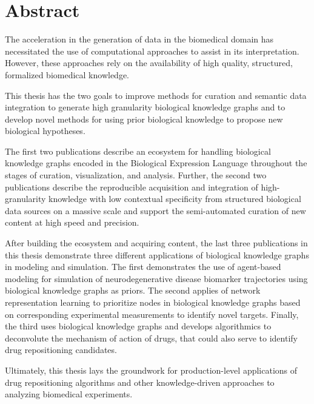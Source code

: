 \chapter*{Abstract}

The acceleration in the generation of data in the biomedical domain has necessitated the use of computational approaches to assist in its interpretation.
However, these approaches rely on the availability of high quality, structured, formalized biomedical knowledge.

This thesis has the two goals to improve methods for curation and semantic data integration to generate high granularity biological knowledge graphs and to develop novel methods for using prior biological knowledge to propose new biological hypotheses.

The first two publications describe an ecosystem for handling biological knowledge graphs encoded in the Biological Expression Language throughout the stages of curation, visualization, and analysis.
Further, the second two publications describe the reproducible acquisition and integration of high-granularity knowledge with low contextual specificity from structured biological data sources on a massive scale and support the semi-automated curation of new content at high speed and precision.

After building the ecosystem and acquiring content, the last three publications in this thesis demonstrate three different applications of biological knowledge graphs in modeling and simulation.
The first demonstrates the use of agent-based modeling for simulation of neurodegenerative disease biomarker trajectories using biological knowledge graphs as priors.
The second applies of network representation learning to prioritize nodes in biological knowledge graphs based on corresponding experimental measurements to identify novel targets.
Finally, the third uses biological knowledge graphs and develops algorithmics to deconvolute the mechanism of action of drugs, that could also serve to identify drug repositioning candidates.

Ultimately, this thesis lays the groundwork for production-level applications of drug repositioning algorithms and other knowledge-driven approaches to analyzing biomedical experiments.
